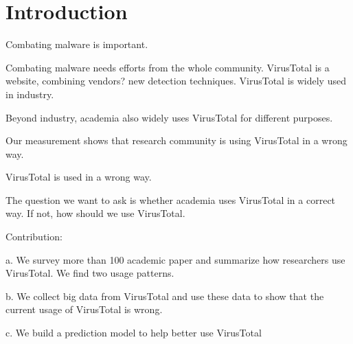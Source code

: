\section{Introduction}

Combating malware is important. 

Combating malware needs efforts from the whole community. VirusTotal is a website, combining vendors? new detection techniques. VirusTotal is widely used in industry.

Beyond industry, academia also widely uses VirusTotal for different purposes. 

Our measurement shows that research community is using VirusTotal in a wrong way. 

VirusTotal is used in a wrong way. 

The question we want to ask is whether academia uses VirusTotal in a correct way. If not, how should we use VirusTotal. 

Contribution:

a. We survey more than 100 academic paper and summarize how researchers use VirusTotal. We find two usage patterns.

b. We collect big data from VirusTotal and use these data to show that the current usage of VirusTotal is wrong. 

c. We build a prediction model to help better use VirusTotal


